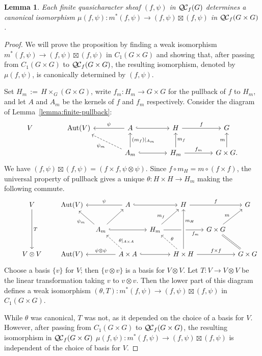 \documentclass{amsart}
\theoremstyle{plain}
\newtheorem{lemma}[theorem]{Lemma}
\theoremstyle{definition}
\theoremstyle{remark}
\DeclareMathOperator{\Aut}{Aut}
\newcommand{\ceq}{{\, :=\, }}
\newcommand{\QC}{{\mathcal{Q\hskip-0.8pt C}}}
\newcommand{\QCf}{{\QC_f}}
\begin{document}
\begin{lemma}\label{lemma:finite-iso}
Each finite quasicharacter sheaf $(f,\psi)$ in $\QCf(G)$ determines a
canonical isomorphism $\mu(f,\psi) : m^*(f,\psi) \to (f,\psi)\boxtimes(f,\psi)$ in $\QCf(G\times G)$. 
 \end{lemma}

\begin{proof}
We will prove the proposition by finding a weak isomorphism 
$m^*(f,\psi) \to (f,\psi)\boxtimes (f,\psi)$ in $C_1(G\times G)$ 
and showing that, after passing from $C_1(G\times G)$ to 
$\QCf(G\times G)$, the resulting isomorphism, 
denoted by $\mu(f,\psi)$, is canonically determined by $(f,\psi)$.

Set $H_m \ceq H\times_G(G\times G)$, 
write $f_m : H_m \to G \times G$ for the pullback of $f$ to $H_m$, 
and let $A$ and $A_m$ be the kernels of $f$ and $f_m$ respectively.  Consider the diagram of Lemma~\ref{lemma:finite-pullback}:
\[
\begin{tikzcd}[column sep=40]
V & \Aut(V) & \arrow[swap]{l}{\psi} A \arrow[hook]{r} & H \arrow{r}{f} &  G\\
  &  & \arrow[dashed]{ul}{\psi_m} \arrow[swap]{u}{(m_f)\vert_{A_m}} A_m \arrow[hook]{r}
  & \arrow[swap]{u}{m_f} H_m \arrow{r}{f_m} & \arrow{u}{m} G\times G.
\end{tikzcd}
\]
We have $(f,\psi) \boxtimes (f,\psi) = (f\times f, \psi\otimes \psi)$.
Since $f\circ m_H = m \circ (f\times f)$, the universal property of pullback gives
a unique $\theta : H\times H \to H_m$ making the following commute.
\[
\begin{tikzcd}[row sep=20,column sep=10]
\ & V \arrow{dd}{T} && \Aut(V) && A \arrow[hook]{rr} \arrow[swap]{ll}{\psi} &&  H \arrow{rr}{f} && G\\
 && && \arrow{ul}{\psi_m} A_m  \arrow[hook]{rr} \arrow{ur} && H_m \arrow[pos=0.3]{ur}{m_f} \arrow[swap, pos=0.8]{rr}{f_m}
 && G \times G \arrow[equal]{dr} \arrow[pos=0.42]{ur}{m} & \\
& V\otimes V && \Aut(V) && \arrow[swap]{ll}{\psi \otimes \psi} \arrow[dashed,swap,pos=0.3]{ul}{\theta\vert_{A\times A}} A\times A \arrow[hook]{rr}
&& \arrow[dashed,swap]{ul}{\theta} \arrow[crossing over,swap,pos=0.7]{uu}{m_H} H\times H \arrow{rr}{f\times f} && G\times G
\end{tikzcd}
\]
Choose a basis $\{ v \}$ for $V$; then $\{ v\otimes v \}$ is a basis for $V\otimes V$.
Let $T : V \to V\otimes V$ be the linear transformation taking $v$ to $v\otimes v$. Then the lower part of this
diagram defines a weak isomorphism $(\theta,T): m^*(f,\psi) \to (f,\psi)\boxtimes (f,\psi)$  in $C_1(G\times G)$. 

While $\theta$ was canonical, $T$ was not, as it depended on the choice of a basis for $V$.
However, after passing from $C_1(G\times G)$ to $\QCf(G\times G)$, the resulting isomorphism in $\QCf(G\times G)$
$\mu(f,\psi): m^*(f,\psi) \to (f,\psi)\boxtimes (f,\psi)$ is independent of the choice of basis for $V$.
 \end{proof}
\end{document}
